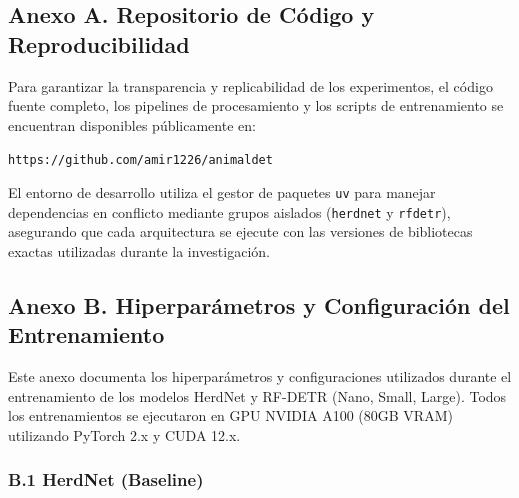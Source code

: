 \clearpage
{}

\subsection*{Anexo A. Repositorio de Código y Reproducibilidad}

Para garantizar la transparencia y replicabilidad de los experimentos, el código fuente completo, los pipelines de procesamiento y los scripts de entrenamiento se encuentran disponibles públicamente en:

\begin{center}
    \texttt{https://github.com/amir1226/animaldet}
\end{center}

El entorno de desarrollo utiliza el gestor de paquetes \texttt{uv} para manejar dependencias en conflicto mediante grupos aislados (\texttt{herdnet} y \texttt{rfdetr}), asegurando que cada arquitectura se ejecute con las versiones de bibliotecas exactas utilizadas durante la investigación.

\subsection*{Anexo B. Hiperparámetros y Configuración del Entrenamiento}

Este anexo documenta los hiperparámetros y configuraciones utilizados durante el entrenamiento de los modelos HerdNet y RF-DETR (Nano, Small, Large). Todos los entrenamientos se ejecutaron en GPU NVIDIA A100 (80GB VRAM) utilizando PyTorch 2.x y CUDA 12.x.

\subsubsection*{B.1 HerdNet (Baseline)}

